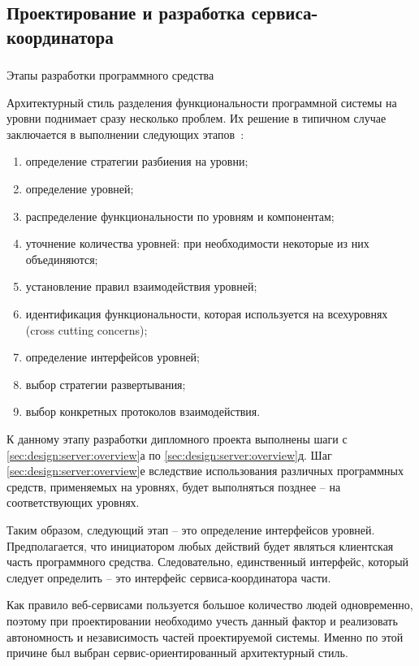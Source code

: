 \subsection{Проектирование и разработка сервиса-координатора}
\label{sec:design:server}

\subsubsection{} Этапы разработки программного средства
\label{sec:design:server:overview}

Архитектурный стиль разделения функциональности программной системы на уровни поднимает сразу несколько проблем. 
Их решение в типичном случае заключается в выполнении следующих этапов~\cite{application_architecture_guide}:

\begin{enumerate}
	\item определение стратегии разбиения на уровни;
	\item определение уровней;
	\item распределение функциональности по уровням и компонентам;
	\item уточнение количества уровней: при необходимости некоторые из них объединяются;
	\item установление правил взаимодействия уровней;
	\item идентификация функциональности, которая используется на всех\linebreak уровнях (cross cutting concerns);
	\item определение интерфейсов уровней;
	\item выбор стратегии развертывания;
	\item выбор конкретных протоколов взаимодействия.
\end{enumerate}

К данному этапу разработки дипломного проекта выполнены шаги с \ref{sec:design:server:overview}а по \ref{sec:design:server:overview}д. 
Шаг \ref{sec:design:server:overview}е вследствие использования различных программных средств, применяемых на уровнях, будет выполняться позднее -- на соответствующих уровнях.

Таким образом, следующий этап -- это определение интерфейсов уровней.
Предполагается, что инициатором любых действий будет являться клиентская часть программного средства. 
Следовательно, единственный интерфейс, который следует определить -- это интерфейс сервиса-координатора части.

Как правило веб-сервисами пользуется большое количество людей одновременно, поэтому при проектировании необходимо учесть данный фактор и реализовать
автономность и независимость частей проектируемой системы. Именно по этой причине был выбран сервис-ориентированный архитектурный стиль.

